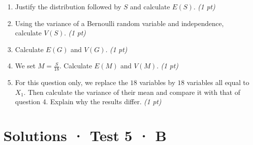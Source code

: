\begin{enumerate}

\item Justify the distribution followed by $S$ and calculate $E(S)$. \hfill\textit{(1 pt)}

\item Using the variance of a Bernoulli random variable and independence, calculate $V(S)$. \hfill\textit{(1 pt)}

\item Calculate $E(G)$ and $V(G)$. \hfill\textit{(1 pt)}

\item We set $M=\frac S{18}$. Calculate $E(M)$ and $V(M)$. \hfill\textit{(1 pt)}

\item For this question only, we replace the $18$ variables by $18$ variables all equal to $X_1$. Then calculate the variance of their mean and compare it with that of question 4. Explain why the results differ. \hfill\textit{(1 pt)}

\end{enumerate}

\ifmxteacher\mxnewpage

\section*{Solutions · Test 5 · B}\label{cor:7-4}

